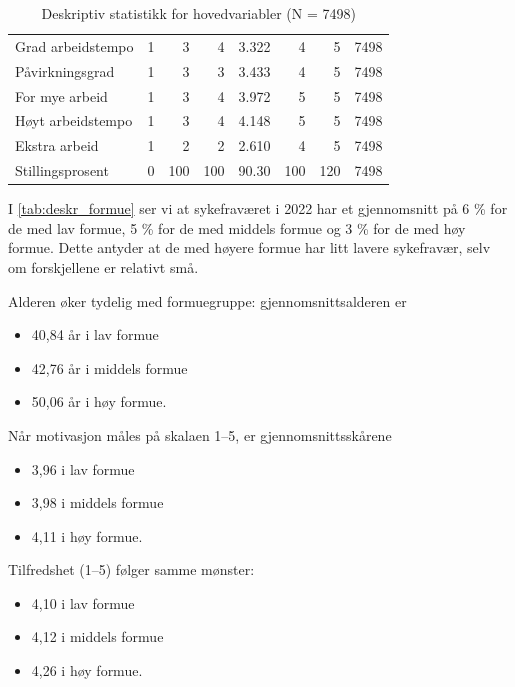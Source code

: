 \documentclass[
  12pt,
  a4paper,
  DIV=11,
  numbers=noendperiod]{scrartcl}
\providecommand{\tightlist}{%
  \setlength{\itemsep}{0pt}\setlength{\parskip}{0pt}}\usepackage{longtable,booktabs,array}
\begin{document}
\begin{table}[ht]
\begin{tabular}{lrrrrrrr}
Grad arbeidstempo                      & 1      & 3      & 4      & 3.322  & 4      & 5      & 7498 \\
Påvirkningsgrad                        & 1      & 3      & 3      & 3.433  & 4      & 5      & 7498 \\
For mye arbeid                         & 1      & 3      & 4      & 3.972  & 5      & 5      & 7498 \\
Høyt arbeidstempo                      & 1      & 3      & 4      & 4.148  & 5      & 5      & 7498 \\
Ekstra arbeid                          & 1      & 2      & 2      & 2.610  & 4      & 5      & 7498 \\
Stillingsprosent                       & 0      & 100    & 100    & 90.30  & 100    & 120    & 7498 \\
\bottomrule
\end{tabular}
\caption{Deskriptiv statistikk for hovedvariabler (N = 7498)}
\label{tab:deskriptiv}
\end{table}

I \autoref{tab:deskr_formue} ser vi at sykefraværet i 2022 har et
gjennomsnitt på 6 \% for de med lav formue, 5 \% for de med middels
formue og 3 \% for de med høy formue. Dette antyder at de med høyere
formue har litt lavere sykefravær, selv om forskjellene er relativt små.

Alderen øker tydelig med formuegruppe: gjennomsnittsalderen er

\begin{itemize}
\tightlist
\item
  40,84 år i lav formue
\item
  42,76 år i middels formue
\item
  50,06 år i høy formue.
\end{itemize}

Når motivasjon måles på skalaen 1--5, er gjennomsnittsskårene

\begin{itemize}
\tightlist
\item
  3,96 i lav formue
\item
  3,98 i middels formue
\item
  4,11 i høy formue.
\end{itemize}

Tilfredshet (1--5) følger samme mønster:

\begin{itemize}
\tightlist
\item
  4,10 i lav formue
\item
  4,12 i middels formue
\item
  4,26 i høy formue.
\end{itemize}
\end{document}
